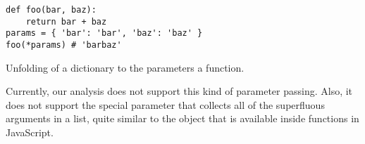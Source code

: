 \begin{listing}[H]
	\begin{verbatim}
def foo(bar, baz):
	return bar + baz
params = { 'bar': 'bar', 'baz': 'baz' }
foo(*params) # 'barbaz'
	\end{verbatim}
\caption{Unfolding of a dictionary to the parameters a function.}\label{code:UnfoldDictFunctionExample}
\end{listing}

Currently, our analysis does not support this kind of parameter passing. Also, it does not support the special  parameter that collects all of the superfluous arguments in a list, quite similar to the  object that is available inside functions in JavaScript.